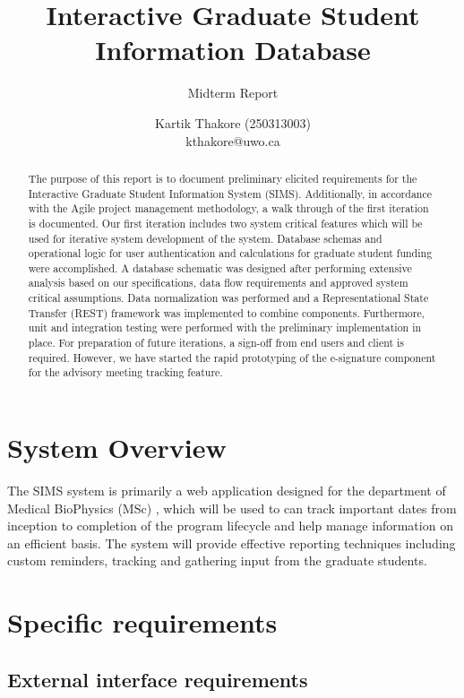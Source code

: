 \documentclass{journal}
\begin{document}

\nocite{*}
\title{Interactive Graduate Student Information Database}
\subtitle{Midterm Report} 
\author{Kartik Thakore (250313003)\\kthakore@uwo.ca}
\maketitle

\begin{abstract}
The purpose of this report is to document preliminary elicited requirements for the Interactive Graduate Student Information System (SIMS). Additionally, in accordance with the Agile project management methodology, a walk through of the first iteration is documented. Our first iteration includes two system critical features which will be used for iterative system development of the system. Database schemas and operational logic for user authentication and calculations for graduate student funding were accomplished.  A database schematic was designed after performing extensive analysis based on our specifications, data flow requirements and approved system critical assumptions. Data normalization was performed and a Representational State Transfer (REST) framework was implemented to combine components. Furthermore, unit and integration testing were performed with the preliminary implementation in place. For preparation of future iterations, a sign-off from end users and client is required. However, we have started the rapid prototyping of the e-signature component for the advisory meeting tracking feature. 
\end{abstract}

\section{System Overview}
The SIMS system is primarily a web application designed for the department of Medical BioPhysics (MSc) , which will be used to can track important dates from inception to completion of the program lifecycle and help manage information on an efficient basis. The system will provide effective reporting techniques including custom reminders, tracking and gathering input from the graduate students. 

\section{Specific requirements}
        \subsection{External interface requirements}
\end{document}
